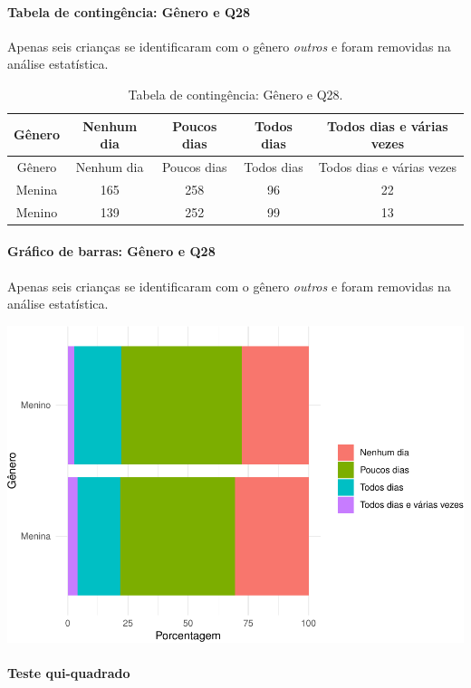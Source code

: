\documentclass[]{article}
\let\oldparagraph\paragraph
\renewcommand{\paragraph}[1]{\oldparagraph{#1}\mbox{}}
\begin{document}
\cleardoublepage

\hypertarget{tabela-de-continguxeancia-guxeanero-e-q28}{%
\paragraph{Tabela de contingência: Gênero e Q28}\label{tabela-de-continguxeancia-guxeanero-e-q28}}

Apenas seis crianças se identificaram com o gênero \emph{outros} e foram removidas na análise estatística.

\begin{longtable}[]{@{}ccccc@{}}
\caption{\label{tab:unnamed-chunk-849}Tabela de contingência: Gênero e Q28.}\tabularnewline
\toprule
Gênero & Nenhum dia & Poucos dias & Todos dias & Todos dias e várias vezes\tabularnewline
\midrule
\endfirsthead
\toprule
Gênero & Nenhum dia & Poucos dias & Todos dias & Todos dias e várias vezes\tabularnewline
\midrule
\endhead
Menina & 165 & 258 & 96 & 22\tabularnewline
Menino & 139 & 252 & 99 & 13\tabularnewline
\bottomrule
\end{longtable}

\hypertarget{gruxe1fico-de-barras-guxeanero-e-q28}{%
\paragraph{Gráfico de barras: Gênero e Q28}\label{gruxe1fico-de-barras-guxeanero-e-q28}}

Apenas seis crianças se identificaram com o gênero \emph{outros} e foram removidas na análise estatística.

\begin{center}\includegraphics[width=0.75\linewidth]{relatorio_covid19_files/figure-latex/unnamed-chunk-850-1} \end{center}

\hypertarget{teste-qui-quadrado-73}{%
\paragraph{Teste qui-quadrado}\label{teste-qui-quadrado-73}}
\end{document}
